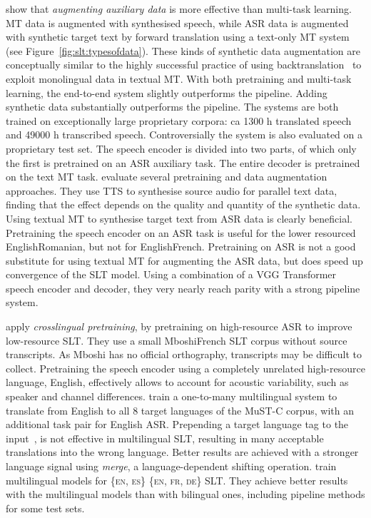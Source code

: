 \documentclass{svjour3}
\newcommand{\lp}[2]{#1#2}
\begin{document}
\citet{jia2019leveraging} show that \emph{augmenting auxiliary data} is more effective than multi-task learning.
MT data is augmented with synthesised speech, while ASR data is augmented with synthetic target text by forward translation using a text-only MT system (see Figure~\ref{fig:slt:typesofdata}).
These kinds of synthetic data augmentation are conceptually similar to the highly successful practice of
using backtranslation~\citep{sennrich2016improving} to exploit monolingual data in textual MT.
With both pretraining and multi-task learning, the end-to-end system slightly outperforms the pipeline.
Adding synthetic data substantially outperforms the pipeline.
The systems are both trained on exceptionally large proprietary corpora: 
ca 1300 h translated speech and 49000 h transcribed speech.
Controversially the system is also evaluated on a proprietary test set.
The speech encoder is divided into two parts, of which only the first is pretrained on an ASR auxiliary task.
The entire decoder is pretrained on the text MT task.
\citet{pino2019harnessing} evaluate several pretraining and data augmentation approaches.
They use TTS to synthesise source audio for parallel text data,
finding that the effect depends on the quality and quantity of the synthetic data.
Using textual MT to synthesise target text from ASR data is clearly beneficial.
Pretraining the speech encoder on an ASR task is useful for the lower resourced \lp{English}{Romanian}, but not for \lp{English}{French}.
Pretraining on ASR is not a good substitute for using textual MT for augmenting the ASR data,
but does speed up convergence of the SLT model.
Using a combination of a VGG Transformer speech encoder and decoder,
they very nearly reach parity with a strong pipeline system.





\citet{bansal2019pre} apply \emph{crosslingual pretraining}, by pretraining on high-resource ASR to improve low-resource SLT.
They use a small \lp{Mboshi}{French} SLT corpus without source transcripts.
As Mboshi has no official orthography, transcripts may be difficult to collect.
Pretraining the speech encoder using a completely unrelated high-resource language, English,
effectively allows to account for acoustic variability, such as speaker and channel differences.
\citet{gangi2019onetomany} train a one-to-many multilingual system to translate from English
to all 8 target languages of the \mbox{MuST-C} corpus,
with an additional task pair for English ASR.
Prepending a target language tag to the input~\citep{johnson-googles-2016}, is not effective in multilingual SLT,
resulting in many acceptable translations into the wrong language.
Better results are achieved with a stronger language signal using \textit{merge},
a language-dependent shifting operation.
\citet{inaguma2019multilingual} train multilingual models for
\{\textsc{en, es}\}  \{\textsc{en, fr, de}\} SLT.
They achieve better results with the multilingual models than with bilingual ones,
including pipeline methods for some test sets.
\end{document}
